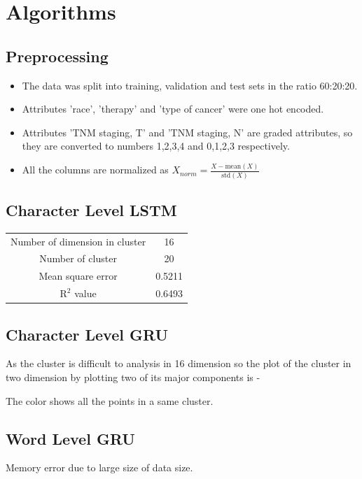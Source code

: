 \documentclass[15pt]{article}
\begin{document}

\section{Algorithms}
\subsection{Preprocessing}
\begin{itemize}
\item The data was split into training, validation and test sets in the ratio 60:20:20. 
\item Attributes 'race', 'therapy'  and 'type of cancer' were one hot encoded.
\item Attributes 'TNM staging, T' and 'TNM staging, N' are graded attributes, so they are converted to numbers 1,2,3,4 and 0,1,2,3 respectively.
\item All the columns are normalized as $X_{norm} = \frac{X - \text{mean}(X)}{\text{std}(X)}$
\end{itemize}

\subsection{Character Level LSTM}
\begin{center}
\begin{tabular}{c c}
Number of dimension in cluster & 16 \\
Number of cluster & 20 \\
Mean square error  & 0.5211 \\
$\text{R}^{2}$ value & 0.6493 \\
\end{tabular}
\end{center}
\subsection{Character Level GRU}
As the cluster is difficult to analysis in 16 dimension so the plot of the cluster in two dimension by plotting two of its major components is -
\begin{center}
\end{center}
The color shows all the points in a same cluster.

\subsection{Word Level GRU}
Memory error due to large size of data size.
\end{document}
